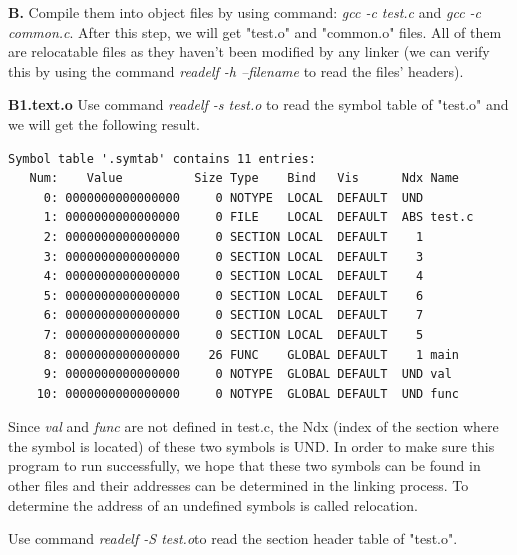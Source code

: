         \textbf{B.} Compile them into object files by using command: \textit{gcc -c test.c} and \textit{gcc -c common.c}. After this step, we will get "test.o" and "common.o" files. All of them are relocatable files as they haven't been modified by any linker (we can verify this by using the command \textit{readelf -h --filename} to read the files' headers).\newline
        
        
        
        \textbf{B1.text.o}
        Use command \textit{readelf -s test.o} to read the symbol table of "test.o" and we will get the following result. 
        
        \begin{lstlisting}[caption= Symbol table of "test.o"]
Symbol table '.symtab' contains 11 entries: 
   Num:    Value          Size Type    Bind   Vis      Ndx Name 
     0: 0000000000000000     0 NOTYPE  LOCAL  DEFAULT  UND 
     1: 0000000000000000     0 FILE    LOCAL  DEFAULT  ABS test.c 
     2: 0000000000000000     0 SECTION LOCAL  DEFAULT    1 
     3: 0000000000000000     0 SECTION LOCAL  DEFAULT    3 
     4: 0000000000000000     0 SECTION LOCAL  DEFAULT    4 
     5: 0000000000000000     0 SECTION LOCAL  DEFAULT    6 
     6: 0000000000000000     0 SECTION LOCAL  DEFAULT    7 
     7: 0000000000000000     0 SECTION LOCAL  DEFAULT    5 
     8: 0000000000000000    26 FUNC    GLOBAL DEFAULT    1 main 
     9: 0000000000000000     0 NOTYPE  GLOBAL DEFAULT  UND val 
    10: 0000000000000000     0 NOTYPE  GLOBAL DEFAULT  UND func
         \end{lstlisting}      
        
        Since \textit{val} and \textit{func} are not defined in test.c, the Ndx (index of the section where the symbol is located) of these two symbols is UND. In order to make sure this program to run successfully, we hope that these two symbols can be found in other files and their addresses can be determined in the linking process. To determine the address of an undefined symbols is called relocation.\newline
        
        Use command \textit{readelf -S test.o}to read the section header table of "test.o". 
        
